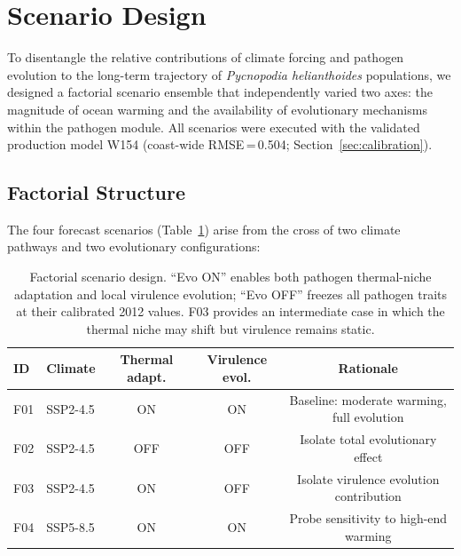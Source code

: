\section{Scenario Design}
\label{sec:scenarios}

To disentangle the relative contributions of climate forcing and pathogen
evolution to the long-term trajectory of \textit{Pycnopodia helianthoides}
populations, we designed a factorial scenario ensemble that independently
varied two axes: the magnitude of ocean warming and the availability of
evolutionary mechanisms within the pathogen module.  All scenarios were
executed with the validated production model W154 (coast-wide
RMSE\,=\,0.504; Section~\ref{sec:calibration}).

\subsection{Factorial Structure}

The four forecast scenarios (Table~\ref{tab:scenarios}) arise from the
cross of two climate pathways and two evolutionary configurations:

\begin{table}[htbp]
\centering
\caption{Factorial scenario design.  ``Evo ON'' enables both pathogen
thermal-niche adaptation and local virulence evolution; ``Evo OFF''
freezes all pathogen traits at their calibrated 2012 values.  F03
provides an intermediate case in which the thermal niche may shift but
virulence remains static.}
\label{tab:scenarios}
\smallskip
\begin{tabular}{llccc}
\toprule
\textbf{ID} & \textbf{Climate} & \textbf{Thermal adapt.} &
  \textbf{Virulence evol.} & \textbf{Rationale} \\
\midrule
F01 & SSP2-4.5 & ON  & ON  & Baseline: moderate warming, full evolution \\
F02 & SSP2-4.5 & OFF & OFF & Isolate total evolutionary effect \\
F03 & SSP2-4.5 & ON  & OFF & Isolate virulence evolution contribution \\
F04 & SSP5-8.5 & ON  & ON  & Probe sensitivity to high-end warming \\
\bottomrule
\end{tabular}
\end{table}

